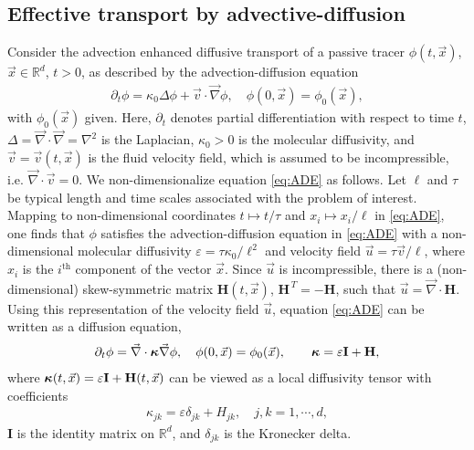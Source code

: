 \documentclass[11pt]{amsart}
\newcommand{\Hb}{\mathbf{H}}
\newcommand{\Ib}{\mathbf{I}}
\newcommand\bkappa{\mbox{\boldmath${\kappa}$}}
\begin{document}
\subsection{Effective transport by
  advective-diffusion} \label{sec:Eff_Trans}  
%
Consider the advection enhanced diffusive transport of a passive
tracer $\phi(t,\vec{x})$, $\vec{x}\in\mathbb{R}^d$, $t>0$, as described by
the advection-diffusion equation 
%
\begin{align}\label{eq:ADE}
  \partial_t\phi=\kappa_0\Delta \phi+\vec{v}\cdot\vec{\nabla}\phi, \quad
  \phi(0,\vec{x})=\phi_0(\vec{x}),
\end{align}
%
with $\phi_0(\vec{x})$ given. Here, $\partial_t$ denotes partial differentiation
with respect to time $t$, $\Delta=\vec{\nabla}\cdot\vec{\nabla}=\nabla^2$ is the Laplacian,
$\kappa_0>0$ is the molecular diffusivity, and $\vec{v}=\vec{v}(t,\vec{x})$
is the fluid velocity field, which is assumed to be incompressible,
i.e. $\vec{\nabla}\cdot\vec{v}=0$. We non-dimensionalize equation
\eqref{eq:ADE} as follows. Let $\ell$ and $\tau$ be typical length and time 
scales associated with the problem of interest. Mapping to
non-dimensional coordinates $t\mapsto t/\tau$ and $x_i\mapsto x_i/\ell$ in
\eqref{eq:ADE}, one finds that $\phi$ satisfies the advection-diffusion
equation in \eqref{eq:ADE} with a non-dimensional molecular
diffusivity $\varepsilon=\tau\kappa_0/\ell^2$ and velocity field $\vec{u}=\tau\vec{v}/\ell$,
where $x_i$ is the $i^{\text{th}}$ component of the vector
$\vec{x}$. Since $\vec{u}$ is incompressible, there is a
(non-dimensional) skew-symmetric matrix $\Hb(t,\vec{x})$,
$\Hb^{\,T}=-\Hb$, such that $\vec{u}=\vec{\nabla}\cdot\Hb$. 
Using this representation of the velocity field $\vec{u}$, equation
\eqref{eq:ADE} can be written as a diffusion equation, 
%
\begin{align}\label{eq:ADE_Divergence}
  \partial_t\phi%
    =\vec{\nabla}\cdot\bkappa\vec{\nabla}\phi, \quad
    \phi(0,\vec{x})=\phi_0(\vec{x}),
    \qquad
    \bkappa=\varepsilon\Ib+\Hb,
\end{align}
%
where $\bkappa(t,\vec{x})=\varepsilon\Ib+\Hb(t,\vec{x})$ can be viewed as a local
diffusivity tensor with coefficients
%
\begin{align}\label{eq:kappa_coeff}
  \kappa_{jk}=\varepsilon\delta_{jk}+H_{jk},\quad j,k=1,\cdots,d,
\end{align}
%
$\Ib$ is the identity matrix on $\mathbb{R}^d$, and $\delta_{jk}$ is 
the Kronecker delta. 
\end{document}
